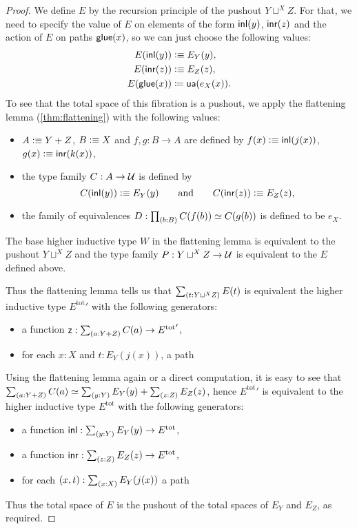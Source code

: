 \begin{proof}
  We define $E$ by the recursion principle of the pushout $Y\sqcup^XZ$. For
  that, we need to specify the value of $E$ on elements of the form ${\mathsf{inl}}(y)$, ${\mathsf{inr}}(z)$
  and the action of $E$ on paths $\mathsf{glue}(x)$, so we can just choose the following
  values:
  \begin{align*}
    E({\mathsf{inl}}(y)) & \vcentcolon\equiv E_Y(y),\\
    E({\mathsf{inr}}(z)) & \vcentcolon\equiv E_Z(z),\\
    {E}\mathopen{}\left({\mathsf{glue}(x)}\right)\mathclose{} & \coloneqq \mathsf{ua}(e_X(x)).
  \end{align*}
  To see that the total space of this fibration is a pushout, we apply the
  flattening lemma (\autoref{thm:flattening}) with the following values:
  \begin{itemize}
  \item $A\vcentcolon\equiv Y+Z$, $B\vcentcolon\equiv X$ and $f,g:B\to A$ are defined by
    $f(x)\vcentcolon\equiv{\mathsf{inl}}(j(x))$, $g(x)\vcentcolon\equiv{\mathsf{inr}}(k(x))$,
  \item the type family $C:A\to\mathcal{U}$ is defined by
    \begin{equation*}
      C({\mathsf{inl}}(y)) \vcentcolon\equiv E_Y(y)
      \qquad\text{and}\qquad
      C({\mathsf{inr}}(z)) \vcentcolon\equiv E_Z(z),
    \end{equation*}
  \item the family of equivalences $D:\prd{b:B}C(f(b))\eqvsym C(g(b))$ is defined
    to be $e_X$.
  \end{itemize}
  The base higher inductive type $W$ in the flattening lemma is equivalent to
  the pushout $Y\sqcup^XZ$ and the type family $P:Y\sqcup^XZ\to\mathcal{U}$ is
  equivalent to the $E$ defined above.

  Thus the flattening lemma tells us that $\sm{t:Y\sqcup^XZ}E(t)$ is equivalent
  the higher inductive type ${E^{\mathrm{tot}}}'$ with the following generators:
  \begin{itemize}
  \item a function $\mathsf{z}:\sm{a:Y+Z}C(a)\to {E^{\mathrm{tot}}}'$,
  \item for each $x:X$ and $t:E_Y(j(x))$, a path
  \end{itemize}
  Using the flattening lemma again or a direct computation, it is easy to see
  that $\eqv{\sm{a:Y+Z}C(a)}{\sm{y:Y}E_Y(y)+\sm{z:Z}E_Z(z)}$, hence
  ${E^{\mathrm{tot}}}'$ is equivalent to the higher inductive type
  $E^{\mathrm{tot}}$ with the following generators:
  \begin{itemize}
  \item a function $\inl:\sm{y:Y}E_Y(y)\to E^{\mathrm{tot}}$,
  \item a function $\inr:\sm{z:Z}E_Z(z)\to E^{\mathrm{tot}}$,
  \item for each $(x,t):\sm{x:X}E_Y(j(x))$ a path
  \end{itemize}
  Thus the total space of $E$ is the pushout of the total spaces of
  $E_Y$ and $E_Z$, as required.
\end{proof}


